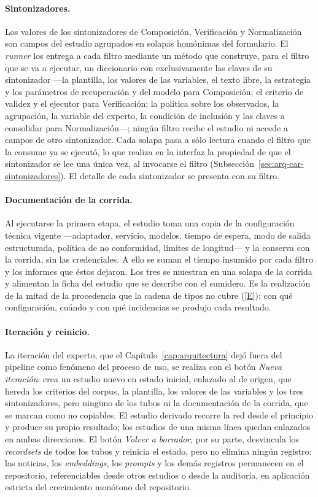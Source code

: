 \documentclass[12pt]{report}
\DeclareRobustCommand{\resp}[1]{\hyperref[tab:registro-responsabilidades]{\textcolor{respcolor}{[#1]}}}
\begin{document}
\paragraph{Sintonizadores.} Los valores de los sintonizadores de Composición, Verificación y Normalización son campos del estudio agrupados en solapas homónimas del formulario. El \textit{runner} los entrega a cada filtro mediante un método que construye, para el filtro que se va a ejecutar, un diccionario con exclusivamente las claves de su sintonizador ---la plantilla, los valores de las variables, el texto libre, la estrategia y los parámetros de recuperación y del modelo para Composición; el criterio de validez y el ejecutor para Verificación; la política sobre los observados, la agrupación, la variable del experto, la condición de inclusión y las claves a consolidar para Normalización---; ningún filtro recibe el estudio ni accede a campos de otro sintonizador. Cada solapa pasa a sólo lectura cuando el filtro que la consume ya se ejecutó, lo que realiza en la interfaz la propiedad de que el sintonizador se lee una única vez, al invocarse el filtro (Subsección~\ref{sec:arq-car-sintonizadores}). El detalle de cada sintonizador se presenta con su filtro.

\paragraph{Documentación de la corrida.} Al ejecutarse la primera etapa, el estudio toma una copia de la configuración técnica vigente ---adaptador, servicio, modelos, tiempo de espera, modo de salida estructurada, política de no conformidad, límites de longitud--- y la conserva con la corrida, sin las credenciales. A ello se suman el tiempo insumido por cada filtro y los informes que éstos dejaron. Los tres se muestran en una solapa de la corrida y alimentan la ficha del estudio que se describe con el sumidero. Es la realización de la mitad de la procedencia que la cadena de tipos no cubre (\resp{E}): con qué configuración, cuándo y con qué incidencias se produjo cada resultado.

\paragraph{Iteración y reinicio.} La iteración del experto, que el Capítulo~\ref{cap:arquitectura} dejó fuera del pipeline como fenómeno del proceso de uso, se realiza con el botón \textit{Nueva iteración}: crea un estudio nuevo en estado inicial, enlazado al de origen, que hereda los criterios del corpus, la plantilla, los valores de las variables y los tres sintonizadores, pero ninguno de los tubos ni la documentación de la corrida, que se marcan como no copiables. El estudio derivado recorre la red desde el principio y produce su propio resultado; los estudios de una misma línea quedan enlazados en ambas direcciones. El botón \textit{Volver a borrador}, por su parte, desvincula los \textit{recordsets} de todos los tubos y reinicia el estado, pero no elimina ningún registro: las noticias, los \textit{embeddings}, los \textit{prompts} y los demás registros permanecen en el repositorio, referenciables desde otros estudios o desde la auditoría, en aplicación estricta del crecimiento monótono del repositorio.
\end{document}
